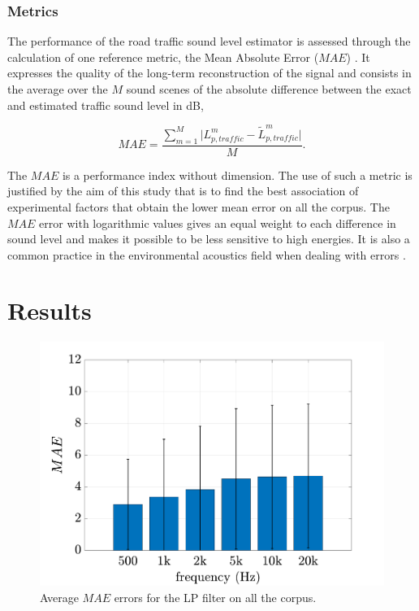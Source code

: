 \documentclass[twocolumn]{svjour3}          %
\begin{document}
\subsubsection{Metrics}

The performance of the road traffic sound level estimator is assessed through the calculation of one reference metric, the Mean Absolute Error ($MAE$) \cite{willmott2005advantages}. It expresses the quality of the long-term reconstruction of the signal and consists in the average over the $M$ sound scenes of the absolute difference between the exact and estimated traffic sound level in dB,

\begin{equation}
MAE = \frac{\sum_{m = 1}^M\vert L^m_{p,traffic}-\tilde{L}^m_{p,traffic} \vert}{M}.
\end{equation}

The $MAE$ is a performance index without dimension. The use of such a metric is justified by the aim of this study that is to find the best association of experimental factors that obtain the lower mean error on all the corpus. The $MAE$ error with logarithmic values gives an equal weight to each difference in sound level and makes it possible to be less sensitive to high energies. It is also a common practice in the environmental acoustics field when dealing with errors  \cite{morillas2014uncertainty} \cite{aumond2018kriging}.

\section{Results}\label{part:results}

\begin{figure}[t]
\centering
\includegraphics[width=\linewidth]{./figures/filter_bar_integrate.pdf}
\caption{Average $MAE$ errors for the LP filter on all the corpus.}
\label{fig:filter_intergate}
\end{figure}
\end{document}
